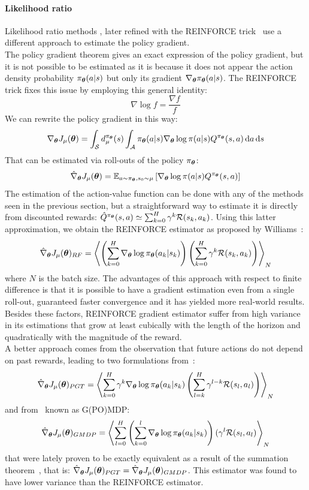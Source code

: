 \paragraph{Likelihood ratio}
Likelihood ratio methods \cite{Glynn:1990:LRG:84537.84552}, later refined with the REINFORCE trick~\cite{Williams1992} use a different approach to estimate the policy gradient.\\
The policy gradient theorem gives an exact expression of the policy gradient, but it is not possible to be estimated as it is because it does not appear the action density probability $\pi_{\vtheta}(a|s)$ but only its gradient $\nabla_\vtheta\pi_{\vtheta}(a|s)$. The REINFORCE trick fixes this issue by employing this general identity:
\[
\nabla\log f = \frac{\nabla f}{f}
\]
We can rewrite the policy gradient in this way:
\[
\gradj = \int_{\sspace} d_\mu^{\pi_{\vtheta}}(s) \int_{\aspace}\pi_{\vtheta}(a|s)\nabla_{\vtheta} \log \pi(a|s) Q^{\pi_{\vtheta}}(s,a) \de a \de s
\]
That can be estimated via roll-outs of the policy $\pi_{\vtheta}$:
\[
\hat{\nabla}_{\vtheta}J_\mu(\vtheta) = \EV[a \sim \pi_{\vtheta}, s_0 \sim \mu]{\nabla_{\vtheta} \log \pi(a|s) Q^{\pi_{\vtheta}}(s,a) }
\]
The estimation of the action-value function can be done with any of the methods seen in the previous section, but a straightforward way to estimate it is directly from discounted rewards: $\hat{Q}^{\pi_{\vtheta}}(s,a) \simeq \sum_{k=0}^H \gamma^k\rfunc (s_k,a_k)$. Using this latter approximation, we obtain the REINFORCE estimator as proposed by Williams~\cite{Williams92simplestatistical}:
\[
\hat{\nabla}_{\vtheta}J_\mu(\vtheta)_{RF} = \left\langle \left(\sum_{k=0}^{H} \nabla_{\vtheta}\log\pi_{\vtheta}(a_k|s_k)  \right)\left(\sum_{k=0}^H \gamma^k\rfunc(s_k,a_k)\right) \right\rangle_{N}
\]
where $N$ is the batch size. The advantages of this approach with respect to finite difference is that it is possible to have a gradient estimation even from a single roll-out, guaranteed faster convergence and it has yielded more real-world results. Besides these factors, REINFORCE gradient estimator suffer from high variance in its estimations that grow at least cubically with the length of the horizon and quadratically with the magnitude of the reward.\\
A better approach comes from the observation that future actions do not depend on past rewards, leading to two formulations from~\cite{Sutton:1999:PGM:3009657.3009806}:
\[
\hat{\nabla}_{\vtheta}J_\mu(\vtheta)_{PGT} = \left\langle \sum_{k=0}^{H} \gamma^k \nabla_{\vtheta}\log\pi_{\vtheta}(a_k|s_k) \left(\sum_{l=k}^H \gamma^{l-k}\rfunc(s_l,a_l)\right) \right\rangle_{N}
\]
and from~\cite{DBLP:journals/corr/abs-1106-0665} known as G(PO)MDP:
\[
\hat{\nabla}_{\vtheta}J_\mu(\vtheta)_{GMDP} = \left\langle \sum_{l=0}^H \left( \sum_{k=0}^{l} \nabla_{\vtheta}\log\pi_{\vtheta}(a_k|s_k) \right) (\gamma^{l}\rfunc(s_l,a_l) \right\rangle_{N}
\]
that were lately proven to be exactly equivalent as a result of the summation theorem~\cite{rade2000springers}, that is: $\hat{\nabla}_{\vtheta}J_\mu(\vtheta)_{PGT} = \hat{\nabla}_{\vtheta}J_\mu(\vtheta)_{GMDP}$.
This estimator was found to have lower variance than the REINFORCE estimator.


